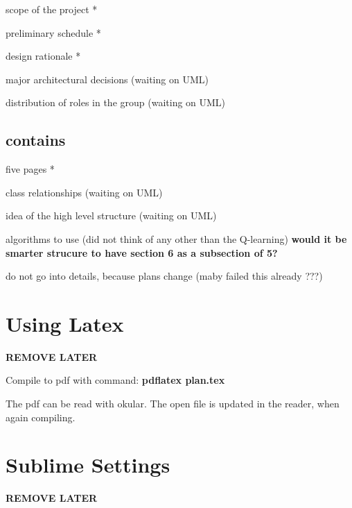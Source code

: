 \documentclass{article}
\begin{document}
scope of the project *

preliminary schedule *

design rationale * %

major architectural decisions (waiting on UML)

distribution of roles in the group (waiting on UML)


\subsection{contains}

five pages *

class relationships (waiting on UML)

idea of the high level structure (waiting on UML)

algorithms to use (did not think of any other than the Q-learning)
\textbf{would it be smarter strucure to have section 6 as a subsection of 5?}

do not go into details, because plans change (maby failed this already ???)





\section{Using Latex}
\textbf{REMOVE LATER}

Compile to pdf with command: \textbf{pdflatex plan.tex}

The pdf can be read with okular.
The open file is updated in the reader, when again compiling.



\section{Sublime Settings}
\textbf{REMOVE LATER}

\end{document}
